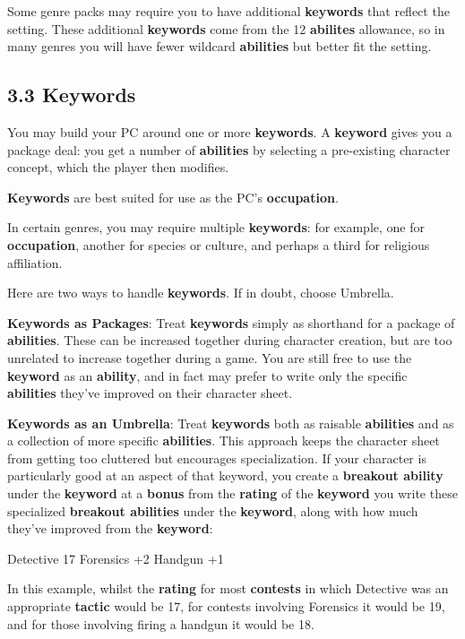 \documentclass[
]{article}
\begin{document}
Some genre packs may require you to have additional \textbf{keywords}
that reflect the setting. These additional \textbf{keywords} come from
the 12 \textbf{abilites} allowance, so in many genres you will have
fewer wildcard \textbf{abilities} but better fit the setting.

\hypertarget{keywords}{%
\subsection{3.3 Keywords}\label{keywords}}

You may build your PC around one or more \textbf{keywords}. A
\textbf{keyword} gives you a package deal: you get a number of
\textbf{abilities} by selecting a pre-existing character concept, which
the player then modifies.

\textbf{Keywords} are best suited for use as the PC's
\textbf{occupation}.

In certain genres, you may require multiple \textbf{keywords}: for
example, one for \textbf{occupation}, another for species or culture,
and perhaps a third for religious affiliation.

Here are two ways to handle \textbf{keywords}. If in doubt, choose
Umbrella.

\textbf{Keywords as Packages}: Treat \textbf{keywords} simply as
shorthand for a package of \textbf{abilities}. These can be increased
together during character creation, but are too unrelated to increase
together during a game. You are still free to use the \textbf{keyword}
as an \textbf{ability}, and in fact may prefer to write only the
specific \textbf{abilities} they've improved on their character sheet.

\textbf{Keywords as an Umbrella}: Treat \textbf{keywords} both as
raisable \textbf{abilities} and as a collection of more specific
\textbf{abilities}. This approach keeps the character sheet from getting
too cluttered but encourages specialization. If your character is
particularly good at an aspect of that keyword, you create a
\textbf{breakout ability} under the \textbf{keyword} at a \textbf{bonus}
from the \textbf{rating} of the \textbf{keyword} you write these
specialized \textbf{breakout abilities} under the \textbf{keyword},
along with how much they've improved from the \textbf{keyword}:

Detective 17 Forensics +2 Handgun +1

In this example, whilst the \textbf{rating} for most \textbf{contests}
in which Detective was an appropriate \textbf{tactic} would be 17, for
contests involving Forensics it would be 19, and for those involving
firing a handgun it would be 18.
\end{document}
